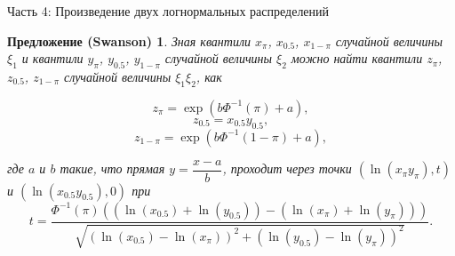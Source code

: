 \documentclass[ucs, notheorems, handout]{beamer}
\newtheorem{proposition}[theorem]{Предложение (Swanson)}
\begin{document}
	\begin{frame}{Часть 4: Произведение двух логнормальных распределений}
		
		\begin{proposition}
			Зная квантили $x_{\pi}$, $x_{0.5}$, $x_{1-\pi}$ случайной величины $\xi_{1}$ и квантили $y_{\pi}$, $y_{0.5}$, $y_{1-\pi}$ случайной величины $\xi_{2}$ можно найти квантили $z_{\pi}$, $z_{0.5}$, $z_{1-\pi}$ случайной величины $\xi_{1}\xi_{2}$, как
			
			\begin{equation*}
				z_{\pi}=\exp(b\Phi^{-1}(\pi)+a),
			\end{equation*}
			\begin{equation*}
				z_{0.5}=x_{0.5}y_{0.5},
			\end{equation*}
			\begin{equation*}
				z_{1-\pi}=\exp(b\Phi^{-1}(1-\pi)+a),
			\end{equation*}
			
			где $a$ и $b$ такие, что прямая $y=\dfrac{x-a}{b}$, проходит через точки $(\ln(x_{\pi}y_{\pi}), t)$ и $(\ln(x_{0.5}y_{0.5}),0)$ при
			\begin{equation*}
				t = \frac{\Phi^{-1}(\pi)((\ln(x_{0.5})+\ln(y_{0.5}))-(\ln(x_{\pi})+\ln(y_{\pi})))}{\sqrt{(\ln(x_{0.5})-\ln(x_{\pi}))^{2}+(\ln(y_{0.5})-\ln(y_{\pi}))^{2}}}. 
			\end{equation*}
		\end{proposition}
		
		
	\end{frame}
	
\end{document}
